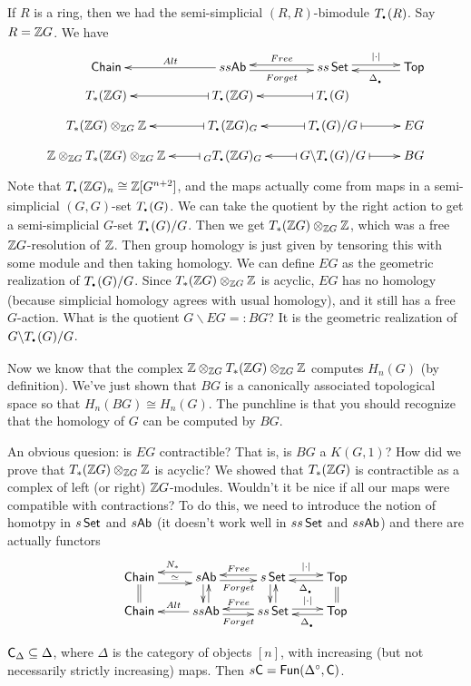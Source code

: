 If $R$ is a ring, then we had the semi-simplicial $(R,R)$-bimodule $T_\udot(R)$. Say $R=\mathbb{Z} G$. We have
\[\xymatrix@R-1.5pc{
 \chain & ss\ab \ar[l]_-{Alt} \ar@<-.5ex>[r]_-{Forget} & ss\set \ar@<-.5ex>[l]_-{Free} \ar@<.5ex>[r]^-{|\cdot|} & \top \ar@<.5ex>[l]^-{\Delta_\udot}\\
  T_*(\ZZ G) & T_\udot(\ZZ G) \ar@{|->}[l] & T_\udot(G) \ar@{|->}[l] \\
  T_*(\ZZ G)\otimes_{\ZZ G} \ZZ & T_\udot(\ZZ G)_G \ar@{|->}[l] & T_\udot(G)/G \ar@{|->}[l] \ar@{|->}[r] & EG\\
  \ZZ \otimes_{\ZZ G} T_*(\ZZ G)\otimes_{\ZZ G} \ZZ & {}_G T_\udot(\ZZ G)_G \ar@{|->}[l] & G\backslash T_\udot(G)/G \ar@{|->}[l] \ar@{|->}[r] & BG
}\]
Note that $T_\udot(\ZZ G)_n\cong \ZZ[G^{n+2}]$, and the maps actually come from maps in a semi-simplicial $(G,G)$-set $T_\udot(G)$. We can take the quotient by the right action to get a semi-simplicial $G$-set $T_\udot(G)/G$. Then we get $T_*(\mathbb{Z} G)\otimes_{\mathbb{Z} G} \mathbb{Z}$, which was a free $\mathbb{Z} G$-resolution of $\mathbb{Z}$. Then group homology is just given by tensoring this with some module and then taking homology. We can define $EG$ as the geometric realization of $T_\udot(G)/G$. Since $T_*(\mathbb{Z} G)\otimes_{\mathbb{Z} G} \mathbb{Z}$ is acyclic, $EG$ has no homology (because simplicial homology agrees with usual homology), and it still has a free $G$-action. What is the quotient $G\backslash EG=:BG$? It is the geometric realization of $G\backslash T_\udot(G)/G$.

Now we know that the complex $\mathbb{Z} \otimes_{\mathbb{Z} G} T_*(\mathbb{Z} G)\otimes_{\mathbb{Z} G} \mathbb{Z}$ computes $H_n(G)$ (by definition). We've just shown that $BG$ is a canonically associated topological space so that $H_n(BG)\cong H_n(G)$. The punchline is that you should recognize that the homology of $G$ can be computed by $BG$.

An obvious quesion: is $EG$ contractible? That is, is $BG$ a $K(G,1)$? How did we prove that $T_*(\mathbb{Z} G)\otimes_{\mathbb{Z} G}\mathbb{Z}$ is acyclic? We showed that $T_*(\mathbb{Z} G)$ is contractible as a complex of left (or right) $\mathbb{Z} G$-modules. Wouldn't it be nice if all our maps were compatible with contractions? To do this, we need to introduce the notion of homotpy in $s\operatorname{\sf Set}$ and $s\text{\sf Ab}$ (it doesn't work well in $ss\operatorname{\sf Set}$ and $ss\text{\sf Ab}$) and there are actually functors
\[\xymatrix@R-1pc{
 \chain \ar@{=}[d] \ar@<-1ex>[r] \ar@{}[r]|-\simeq & s\ab \ar@<-.5ex>[d]\ar@{<-}@<.5ex>[d] \ar@<-1ex>[l]_{N_*} \ar@<-.5ex>[r]_-{Forget} & s\set \ar@<-.5ex>[d]\ar@{<-}@<.5ex>[d] \ar@<-.5ex>[l]_-{Free} \ar@<.5ex>[r]^-{|\cdot|} & \top \ar@{=}[d] \ar@<.5ex>[l]^-{\Delta_\udot}\\
 \chain & ss\ab \ar[l]_-{Alt} \ar@<-.5ex>[r]_-{Forget} & ss\set \ar@<-.5ex>[l]_-{Free} \ar@<.5ex>[r]^-{|\cdot|} & \top \ar@<.5ex>[l]^-{\Delta_\udot}\\
}\]
$\text{\sf C}_\Delta\subseteq \Delta$, where $\Delta$ is the category of objects $[n]$, with increasing (but not necessarily strictly increasing) maps. Then $s\text{\sf C}=\text{\sf Fun}(\Delta^\circ, \text{\sf C})$.

